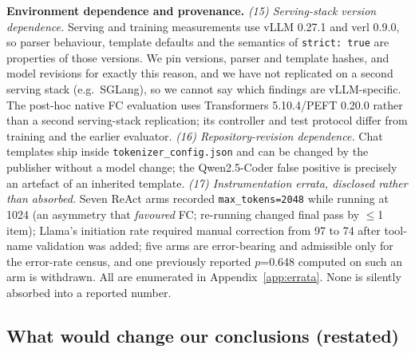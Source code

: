 \textbf{Environment dependence and provenance.}
\emph{(15) Serving-stack version dependence.} Serving and training measurements use vLLM 0.27.1 and verl
0.9.0, so parser behaviour, template defaults and the semantics of \texttt{strict: true} are
properties of those versions. We pin versions, parser and template hashes, and model revisions for
exactly this reason, and we have not replicated on a second serving stack (e.g.\ SGLang), so we
cannot say which findings are vLLM-specific. The post-hoc native FC evaluation uses
Transformers 5.10.4/PEFT 0.20.0 rather than a second serving-stack replication;
its controller and test protocol differ from training and the earlier evaluator.
\emph{(16) Repository-revision dependence.} Chat templates ship inside
\texttt{tokenizer\_config.json} and can be changed by the publisher without a model change; the
Qwen2.5-Coder false positive is precisely an artefact of an inherited template.
\emph{(17) Instrumentation errata, disclosed rather than absorbed.} Seven ReAct arms recorded
\texttt{max\_tokens=2048} while running at 1024 (an asymmetry that \emph{favoured} FC; re-running
changed final pass by $\leq$1 item); Llama's initiation rate required manual correction from 97 to
74 after tool-name validation was added; five arms are error-bearing and admissible only for the
error-rate census, and one previously reported $p$=0.648 computed on such an arm is withdrawn. All
are enumerated in Appendix~\ref{app:errata}. None is silently absorbed into a reported number.

\subsection*{What would change our conclusions (restated)}

